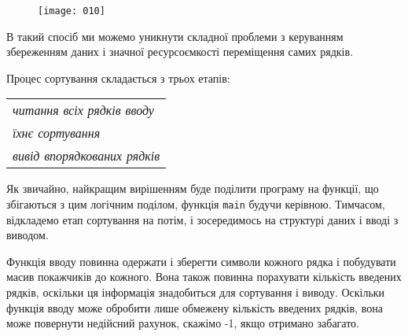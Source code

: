 \documentclass[a4paper,12pt]{book}
\begin{document}
  \begin{figure}[!htb]
  \centering
  \texttt{[image: 010]}
  \end{figure}

  В такий спосіб ми можемо уникнути складної проблеми з керуванням збереженням даних і
  значної ресурсоємкості переміщення самих рядків.

  Процес сортування складається з трьох етапів:

  \vspace{12pt}
  \begin{tabular}{l}
  \textit{читання всіх рядків вводу} \\
  \textit{їхнє сортування} \\
  \textit{вивід впорядкованих рядків}\\
  \end{tabular}
  \vspace{12pt}

  Як звичайно, найкращим вирішенням буде поділити програму на функції, що збігаються з цим
  логічним поділом, функція \texttt{main} будучи керівною. Тимчасом, відкладемо етап
  сортування на потім, і зосередимось на структурі даних і вводі з виводом.

  Функція вводу повинна одержати і зберегти символи кожного рядка і побудувати масив
  покажчиків до кожного. Вона також повинна порахувати кількість введених рядків,
  оскільки ця інформація знадобиться для сортування і виводу. Оскільки функція вводу може
  обробити лише обмежену кількість введених рядків, вона може повернути недійсний
  рахунок, скажімо -1, якщо отримано забагато.
\end{document}
